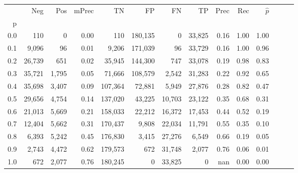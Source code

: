 \begin{tabular}{rrrrrrrrrrrrrr}
\toprule
{} &     Neg &    Pos & mPrec &       TN &       FP &      FN &      TP &  Prec &   Rec & $\hat{p}$ \\
p   &         &        &       &          &          &         &         &       &       &           \\
\midrule
0.0 &     110 &      0 &  0.00 &      110 &  180,135 &       0 &  33,825 &  0.16 &  1.00 &      1.00 \\
0.1 &   9,096 &     96 &  0.01 &    9,206 &  171,039 &      96 &  33,729 &  0.16 &  1.00 &      0.96 \\
0.2 &  26,739 &    651 &  0.02 &   35,945 &  144,300 &     747 &  33,078 &  0.19 &  0.98 &      0.83 \\
0.3 &  35,721 &  1,795 &  0.05 &   71,666 &  108,579 &   2,542 &  31,283 &  0.22 &  0.92 &      0.65 \\
0.4 &  35,698 &  3,407 &  0.09 &  107,364 &   72,881 &   5,949 &  27,876 &  0.28 &  0.82 &      0.47 \\
0.5 &  29,656 &  4,754 &  0.14 &  137,020 &   43,225 &  10,703 &  23,122 &  0.35 &  0.68 &      0.31 \\
0.6 &  21,013 &  5,669 &  0.21 &  158,033 &   22,212 &  16,372 &  17,453 &  0.44 &  0.52 &      0.19 \\
0.7 &  12,404 &  5,662 &  0.31 &  170,437 &    9,808 &  22,034 &  11,791 &  0.55 &  0.35 &      0.10 \\
0.8 &   6,393 &  5,242 &  0.45 &  176,830 &    3,415 &  27,276 &   6,549 &  0.66 &  0.19 &      0.05 \\
0.9 &   2,743 &  4,472 &  0.62 &  179,573 &      672 &  31,748 &   2,077 &  0.76 &  0.06 &      0.01 \\
1.0 &     672 &  2,077 &  0.76 &  180,245 &        0 &  33,825 &       0 &   nan &  0.00 &      0.00 \\
\bottomrule
\end{tabular}
